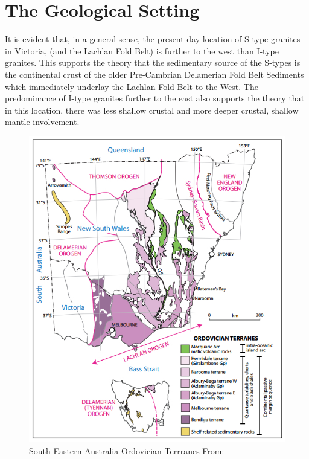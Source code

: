 \documentclass[a4paper]{article}
\begin{document}
\section{The Geological Setting}

It is evident that, in a general sense, the present day location of S-type granites in Victoria, (and the Lachlan Fold Belt) is further to the west than I-type granites. This supports the theory that the sedimentary source of the S-types is the continental crust of the older Pre-Cambrian Delamerian Fold Belt Sediments which immediately underlay the Lachlan Fold Belt to the West. The predominance of I-type granites further to the east also supports the theory that in this location, there was less shallow crustal and more deeper crustal, shallow mantle involvement.

\begin{figure}[H]
\centering
\includegraphics[width=1\textwidth]{SEAustraliaOrdovicianTerrannes.jpg}
\caption{\label{fig:SEAustraliaOrdovicianTerrannes}South Eastern Australia Ordovician Terrranes From: \cite{aitchison2012accordion}}
\end{figure}
\end{document}
